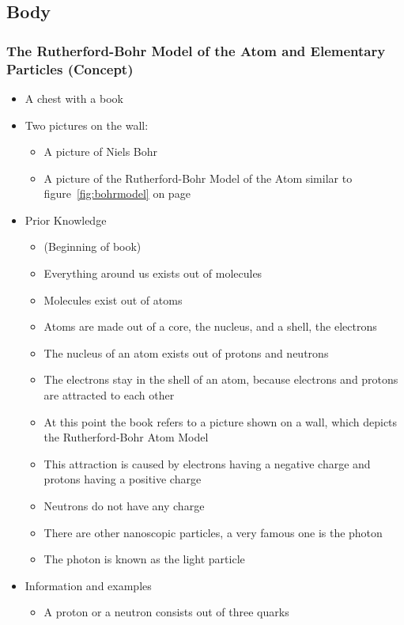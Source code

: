 \documentclass[11pt,twoside]{report} %
\begin{document}
\subsection{Body}

\subsubsection{The Rutherford-Bohr Model of the Atom and Elementary Particles (Concept)}
	\begin{itemize}
		\item A chest with a book
		\item Two pictures on the wall:
		\begin{itemize}
			\item A picture of Niels Bohr
			\item A picture of the Rutherford-Bohr Model of the Atom similar to figure~\ref{fig:bohrmodel} on page~\pageref{fig:bohrmodel}
		\end{itemize}
		\item Prior Knowledge
		\begin{itemize}
			\item (Beginning of book)
			\item Everything around us exists out of molecules
			\item Molecules exist out of atoms
			\item Atoms are made out of a core, the nucleus, and a shell, the electrons
			\item The nucleus of an atom exists out of protons and neutrons
			\item The electrons stay in the shell of an atom, because electrons and protons are attracted to each other
			\item At this point the book refers to a picture shown on a wall, which depicts the Rutherford-Bohr Atom Model
			\item This attraction is caused by electrons having a negative charge and protons having a positive charge
			\item Neutrons do not have any charge
			\item There are other nanoscopic particles, a very famous one is the photon
			\item The photon is known as the light particle
		\end{itemize}
		\item Information and examples
		\begin{itemize}
			\item A proton or a neutron consists out of three quarks

\end{itemize}
\end{itemize}
\end{document}
